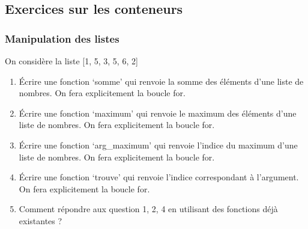 \documentclass[letterpaper,10pt,english]{sphinxhowto}
\begin{document}
\subsection{Exercices sur les conteneurs}
\label{\detokenize{cours3_conteneur_exercices:exercices-sur-les-conteneurs}}\label{\detokenize{cours3_conteneur_exercices::doc}}

\subsubsection{Manipulation des listes}
\label{\detokenize{cours3_conteneur_exercices:manipulation-des-listes}}
\sphinxAtStartPar
On considère la liste {[}1, 5, 3, 5, 6, 2{]}
\begin{enumerate}
%
\item {} 
\sphinxAtStartPar
Écrire une fonction ‘somme’ qui renvoie la somme des éléments d’une liste de nombres. On fera explicitement la boucle for.

\item {} 
\sphinxAtStartPar
Écrire une fonction ‘maximum’ qui renvoie le maximum des éléments d’une liste de nombres. On fera explicitement la boucle for.

\item {} 
\sphinxAtStartPar
Écrire une fonction ‘arg\_maximum’ qui renvoie l’indice du maximum d’une liste de nombres. On fera explicitement la boucle for.

\item {} 
\sphinxAtStartPar
Écrire une fonction ‘trouve’ qui renvoie l’indice correspondant à l’argument. On fera explicitement la boucle for.

\item {} 
\sphinxAtStartPar
Comment répondre aux question 1, 2, 4 en utilisant des fonctions déjà existantes ?

\end{enumerate}
\end{document}
